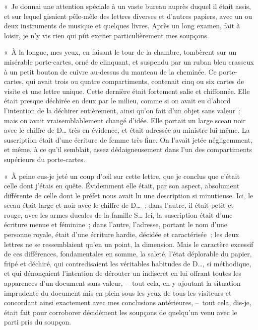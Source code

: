 \documentclass[french,twoside]{book} %
\begin{document}
« Je donnai une attention spéciale à un vaste bureau auprès duquel il était assis, et sur lequel gisaient pêle-mêle des lettres diverses et d’autres papiers, avec un ou deux instruments de musique et quelques livres. Après un long examen, fait à loisir, je n’y vis rien qui pût exciter particulièrement mes soupçons.\par
« À la longue, mes yeux, en faisant le tour de la chambre, tombèrent sur un misérable porte-cartes, orné de clinquant, et suspendu par un ruban bleu crasseux à un petit bouton de cuivre au-dessus du manteau de la cheminée. Ce porte-cartes, qui avait trois ou quatre compartiments, contenait cinq ou six cartes de visite et une lettre unique. Cette dernière était fortement salie et chiffonnée. Elle était presque déchirée en deux par le milieu, comme si on avait eu d’abord l’intention de la déchirer entièrement, ainsi qu’on fait d’un objet sans valeur ; mais on avait vraisemblablement changé d’idée. Elle portait un large sceau noir avec le chiffre de D… très en évidence, et était adressée au ministre lui-même. La suscription était d’une écriture de femme très fine. On l’avait jetée négligemment, et même, à ce qu’il semblait, assez dédaigneusement dans l’un des compartiments supérieurs du porte-cartes.\par
« À peine eus-je jeté un coup d’œil sur cette lettre, que je conclus que c’était celle dont j’étais en quête. Évidemment elle était, par son aspect, absolument différente de celle dont le préfet nous avait lu une description si minutieuse. Ici, le sceau était large et noir avec le chiffre de D… ; dans l’autre, il était petit et rouge, avec les armes ducales de la famille S… Ici, la suscription était d’une écriture menue et féminine ; dans l’autre, l’adresse, portant le nom d’une personne royale, était d’une écriture hardie, décidée et caractérisée ; les deux lettres ne se ressemblaient qu’en un point, la dimension. Mais le caractère excessif de ces différences, fondamentales en somme, la saleté, l’état déplorable du papier, fripé et déchiré, qui contredisaient les véritables habitudes de D…, si méthodique, et qui dénonçaient l’intention de dérouter un indiscret en lui offrant toutes les apparences d’un document sans valeur, – tout cela, en y ajoutant la situation imprudente du document mis en plein sous les yeux de tous les visiteurs et concordant ainsi exactement avec mes conclusions antérieures, – tout cela, dis-je, était fait pour corroborer décidément les soupçons de quelqu’un venu avec le parti pris du soupçon.\par
\end{document}
